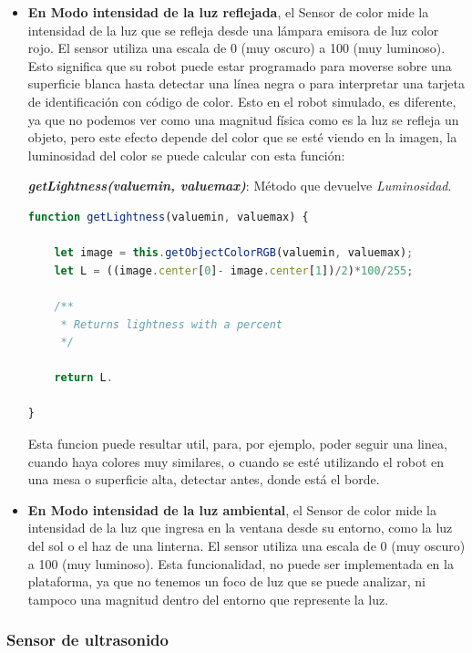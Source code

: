 \begin{itemize}
\item\textbf{En Modo intensidad de la luz reflejada}, el Sensor de color mide la intensidad de la luz que se refleja desde una lámpara emisora de luz color rojo. El sensor utiliza una escala de 0 (muy oscuro) a 100 (muy luminoso). Esto significa que su robot puede estar programado para moverse sobre una superficie blanca hasta detectar una línea negra o para interpretar una tarjeta de identificación con código de color.
Esto en el robot simulado, es diferente, ya que no podemos ver como una magnitud física como es la luz se refleja un objeto, pero este efecto depende del color que se esté viendo en la imagen, la luminosidad del color se puede calcular con esta función:

\textit{\textbf{getLightness(valuemin, valuemax)}}: Método que devuelve  \textit{Luminosidad}. 
    
    \begin{lstlisting}[language=javascript]
   function getLightness(valuemin, valuemax) {
    
    let image = this.getObjectColorRGB(valuemin, valuemax);
    let L = ((image.center[0]- image.center[1])/2)*100/255;
    
    /**
     * Returns lightness with a percent
     */
    
    return L.

}
\end{lstlisting}

Esta funcion puede resultar util, para, por ejemplo, poder seguir una linea, cuando haya colores muy similares, o cuando se esté utilizando el robot en una mesa o superficie alta, detectar antes, donde está el borde.

\item\textbf{En Modo intensidad de la luz ambiental}, el Sensor de color mide la intensidad de la luz que ingresa en la ventana desde su entorno, como la luz del sol o el haz de una linterna. El sensor utiliza una escala de 0 (muy oscuro) a 100 (muy luminoso). Esta funcionalidad, no puede ser implementada en la plataforma, ya que no tenemos un foco de luz que se puede analizar, ni tampoco una magnitud dentro del entorno que represente la luz.

\end{itemize}

\subsubsection{Sensor de ultrasonido}

